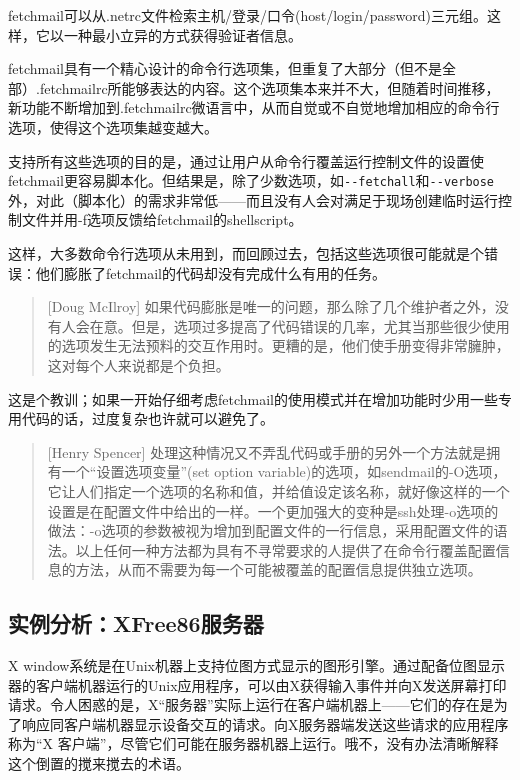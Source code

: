 \documentclass[12pt,oneside]{book}
\begin{document}
\begin{common-format}
fetchmail可以从.netrc文件检索主机/登录/口令(host/login/password)三元组。这样，它以一种最小立异的方式获得验证者信息。

fetchmail具有一个精心设计的命令行选项集，但重复了大部分（但不是全部）.fetchmailrc所能够表达的内容。这个选项集本来并不大，但随着时间推移，新功能不断增加到.fetchmailrc微语言中，从而自觉或不自觉地增加相应的命令行选项，使得这个选项集越变越大。

支持所有这些选项的目的是，通过让用户从命令行覆盖运行控制文件的设置使fetchmail更容易脚本化。但结果是，除了少数选项，如\verb+--fetchall+和\verb+--verbose+外，对此（脚本化）的需求非常低——而且没有人会对满足于现场创建临时运行控制文件并用-f选项反馈给fetchmail的shellscript。

这样，大多数命令行选项从未用到，而回顾过去，包括这些选项很可能就是个错误：他们膨胀了fetchmail的代码却没有完成什么有用的任务。

\begin{quote}[Doug McIlroy]
如果代码膨胀是唯一的问题，那么除了几个维护者之外，没有人会在意。但是，选项过多提高了代码错误的几率，尤其当那些很少使用的选项发生无法预料的交互作用时。更糟的是，他们使手册变得非常臃肿，这对每个人来说都是个负担。
\end{quote}

这是个教训；如果一开始仔细考虑fetchmail的使用模式并在增加功能时少用一些专用代码的话，过度复杂也许就可以避免了。

\begin{quote}[Henry Spencer]
处理这种情况又不弄乱代码或手册的另外一个方法就是拥有一个“设置选项变量”(set option variable)的选项，如sendmail的-O选项，它让人们指定一个选项的名称和值，并给值设定该名称，就好像这样的一个设置是在配置文件中给出的一样。一个更加强大的变种是ssh处理-o选项的做法：-o选项的参数被视为增加到配置文件的一行信息，采用配置文件的语法。以上任何一种方法都为具有不寻常要求的人提供了在命令行覆盖配置信息的方法，从而不需要为每一个可能被覆盖的配置信息提供独立选项。
\end{quote}


\subsection{实例分析：XFree86服务器}
X window系统是在Unix机器上支持位图方式显示的图形引擎。通过配备位图显示器的客户端机器运行的Unix应用程序，可以由X获得输入事件并向X发送屏幕打印请求。令人困惑的是，X“服务器”实际上运行在客户端机器上——它们的存在是为了响应同客户端机器显示设备交互的请求。向X服务器端发送这些请求的应用程序称为“X
客户端”，尽管它们可能在服务器机器上运行。哦不，没有办法清晰解释这个倒置的搅来搅去的术语。


\end{common-format}
\end{document}
